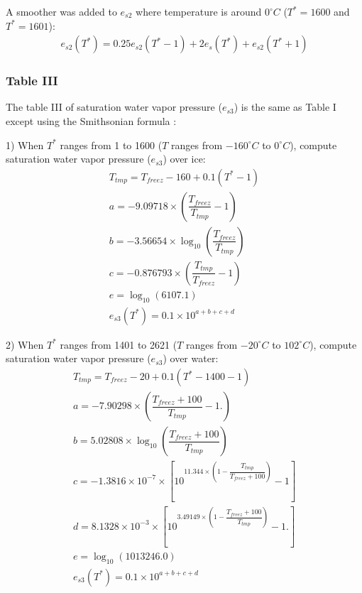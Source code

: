 \documentclass[letterpaper,titlepage,10pt]{article}
\numberwithin{equation}{section}
\begin{document}
A smoother was added to $e_{s2}$ where temperature is around $0^\circ C$ ($T^* = 1600$ and $T^* = 1601$):
\begin{gather}
	e_{s2}(T^*) = 0.25 e_{s2}(T^*-1) + 2 e_s(T^*) + e_{s2}(T^*+1)
\end{gather}


\subsubsection*{Table III}

The table III of saturation water vapor pressure ($e_{s3}$) is the same as Table I except using the Smithsonian formula \citet{smithsonian1951smith}:

1) When $T^*$ ranges from 1 to 1600 ($T$ ranges from $-160^\circ C$ to $0^\circ C$), compute saturation water vapor pressure ($e_{s3}$) over ice:
\begin{gather}
	T_{tmp} = T_{freez} - 160 + 0.1\left( T^* - 1 \right) \\
	a = - 9.09718 \times \left(\dfrac{T_{freez}}{T_{tmp}} - 1 \right) \\
	b = - 3.56654 \times \log_{10} \left(\dfrac{T_{freez}}{T_{tmp}} \right) \\
	c = - 0.876793 \times \left(\dfrac{T_{tmp}}{T_{freez}} - 1 \right) \\
	e = \log_{10} \left(6107.1 \right) \\
	e_{s3}(T^*) = 0.1 \times 10^{a + b + c + d}
\end{gather}

2) When $T^*$ ranges from 1401 to 2621 ($T$ ranges from $-20^\circ C$ to $102^\circ C$), compute saturation water vapor pressure ($e_{s3}$) over water:
\begin{gather}
	T_{tmp} = T_{freez} - 20 + 0.1\left( T^* - 1400 - 1 \right) \\
	a = - 7.90298 \times \left(\dfrac{T_{freez} + 100}{T_{tmp}} - 1. \right) \\
	b = 5.02808 \times \log_{10} \left(\dfrac{T_{freez} + 100}{T_{tmp}} \right) \\
	c = - 1.3816 \times 10^{-7} \times \left[10^{11.344 \times \left(1 - \dfrac{T_{tmp}}{T_{freez} + 100} \right)} - 1 \right] \\
	d = 8.1328 \times 10^{-3} \times \left[10^{3.49149 \times \left(1 - \dfrac{T_{freez} + 100}{T_{tmp}} \right)} - 1. \right] \\
	e = \log_{10} \left(1013246.0 \right) \\
	e_{s3}(T^*) = 0.1 \times 10^{a + b + c + d}
\end{gather}
\end{document}
